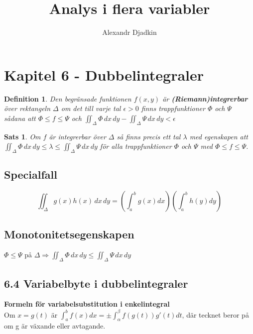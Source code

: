 \documentclass[a4paper]{article}
\title{Analys i flera variabler}
\author{Alexandr Djadkin}
\newtheorem{thm}{Sats}
\newtheorem{dfn}{Definition}
\begin{document}
\maketitle




\section*{Kapitel 6 - Dubbelintegraler}

\begin{dfn}

Den begränsade funktionen $f(x,y)$ är \textbf{(Riemann)integrerbar} över rektangeln $\Delta$ om det till varje tal $\epsilon > 0$ finns trappfunktioner $\Phi$ och $\Psi$ sådana att $\Phi \leq f \leq \Psi$ och $\iint_\Delta \Phi \,dx \,dy - \iint_\Delta \Psi \,dx \,dy < \epsilon$

\end{dfn}


\begin{thm}
Om $f$ är integrerbar över $\Delta$ så finns precis ett tal $\lambda$ med egenskapen att  $\iint_\Delta \Phi\,dx\,dy \leq \lambda \leq \iint_\Delta \Psi\,dx\,dy$  för alla trappfunktioner $\Phi$ och $\Psi$ med $\Phi \leq f \leq \Psi$.

\end{thm}


\subsection*{Specialfall}

\begin{equation}
\iint_\Delta g(x)h(x)\,dx \,dy = \left(\int_{a}^{b} g(x) dx\right)\left(\int_{a}^{b} h(y) dy\right)
\end{equation} 

\subsection*{Monotonitetsegenskapen}


$\Phi \leq \Psi $ på $ \Delta \Rightarrow \iint_\Delta \Phi \,dx \,dy \leq \iint_\Delta \Psi \,dx \,dy\
$

\subsection*{6.4 Variabelbyte i dubbelintegraler}

\textbf{Formeln för variabelsubstitution i enkelintegral}
\\[2mm]
Om $ x = g(t) $ är $ \int_{a}^{b} f(x) dx = \pm \int_{\alpha}^{\beta} f(g(t))g'(t)dt $, där tecknet beror på om g är växande eller avtagande.
\\[2mm]
\end{document}
